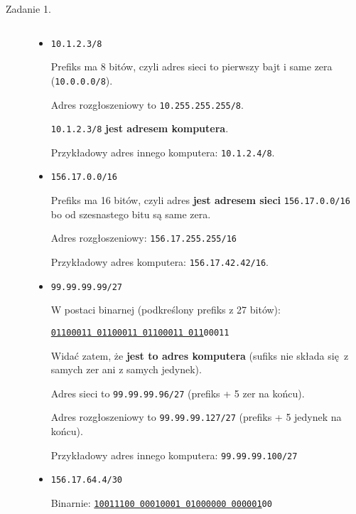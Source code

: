 \documentclass[a4paper, oneside]{article}
\begin{document}
\begin{description}
    \item[Zadanie 1.]$ $

    \begin{itemize}
        \item {
            \texttt{10.1.2.3/8}

            Prefiks ma 8 bitów, czyli adres sieci to pierwszy bajt i 
            same zera (\texttt{10.0.0.0/8}).
            
            Adres rozgłoszeniowy to \texttt{10.255.255.255/8}. 
            
            \texttt{10.1.2.3/8} \textbf{jest adresem komputera}.

            Przykładowy adres innego komputera: \texttt{10.1.2.4/8}.
        }

        \item {
            \texttt{156.17.0.0/16}

            Prefiks ma 16 bitów, czyli adres \textbf{jest adresem sieci} 
            \texttt{156.17.0.0/16} bo od szesnastego bitu są same zera.

            Adres rozgłoszeniowy: \texttt{156.17.255.255/16}

            Przykładowy adres komputera: \texttt{156.17.42.42/16}.
        }

        \item {
            \texttt{99.99.99.99/27}

            W postaci binarnej (podkreślony prefiks z 27 bitów): 

            \underline{\texttt{01100011 01100011 01100011 011}}\texttt{00011}

            Widać zatem, że \textbf{jest to adres komputera} (sufiks nie składa 
            się z samych zer ani z samych jedynek).

            Adres sieci to \texttt{99.99.99.96/27} (prefiks + 5 zer na końcu).

            Adres rozgłoszeniowy to \texttt{99.99.99.127/27} (prefiks + 5 
            jedynek na końcu).

            Przykładowy adres innego komputera: \texttt{99.99.99.100/27}
        }

        \item {
            \texttt{156.17.64.4/30}

            Binarnie: 
            \underline{\texttt{10011100 00010001 01000000 000001}}\texttt{00}

}
\end{itemize}
\end{description}
\end{document}
